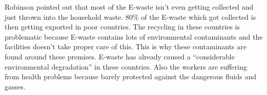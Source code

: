 Robinson \cite{Robinson2009} pointed out that most of the E-waste isn't even getting collected and just thrown into the household waste. 80\% of the E-waste which got collected is then getting exported in poor countries. The recycling in these countries is problematic because E-waste contains lots of environmental contaminants and the facilities doesn't take proper care of this. This is why these contaminants are found around these premises. E-waste has already caused a "`considerable environmental degradation"'\cite{Robinson2009} in these countries. Also the workers are suffering from health problems because barely protected against the dangerous fluids and gasses.